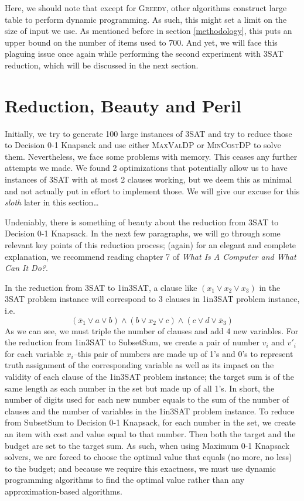 \documentclass[12pt, oneside]{book}
\begin{document}
Here, we should note that except for \textsc{Greedy}, other algorithms
construct large table to perform dynamic programming. As such, this
might set a limit on the size of input we use. As mentioned before in
section \ref{methodology}, this puts an upper bound on the number of
items used to 700. And yet, we will face this plaguing issue once again
while performing the second experiment with 3SAT reduction, which will
be discussed in the next section.

\chapter{Reduction, Beauty and Peril}\label{reduction}

Initially, we try to generate 100 large instances of 3SAT and try to
reduce those to Decision 0-1 Knapsack and use either \textsc{MaxValDP}
or \textsc{MinCostDP} to solve them. Nevertheless, we face some problems
with memory. This ceases any further attempts we made. We found 2
optimizations that potentially allow us to have instances of 3SAT with
at most 2 clauses working, but we deem this as minimal and not actually
put in effort to implement those. We will give our excuse for this
\emph{sloth} later in this section\ldots{}

Undeniably, there is something of beauty about the reduction from 3SAT
to Decision 0-1 Knapsack. In the next few paragraphs, we will go through
some relevant key points of this reduction process; (again) for an
elegant and complete explanation, we recommend reading chapter 7 of
\emph{What Is A Computer and What Can It Do?}.

In the reduction from 3SAT to 1in3SAT, a clause like
\((x_1 \lor x_2 \lor x_3)\) in the 3SAT problem instance will correspond
to 3 clauses in 1in3SAT problem instance, i.e.
\[(\bar{x}_1 \lor a \lor b)\land (b \lor x_2 \lor c)\land (c \lor d \lor \bar{x}_3)\]
As we can see, we must triple the number of clauses and add 4 new
variables. For the reduction from 1in3SAT to SubsetSum, we create a pair
of number \(v_i\) and \(v'_i\) for each variable \(x_i\)--this pair of
numbers are made up of 1's and 0's to represent truth assignment of the
corresponding variable as well as its impact on the validity of each
clause of the 1in3SAT problem instance; the target sum is of the same
length as each number in the set but made up of all 1's. In short, the
number of digits used for each new number equals to the sum of the
number of clauses and the number of variables in the 1in3SAT problem
instance. To reduce from SubsetSum to Decision 0-1 Knapsack, for each
number in the set, we create an item with cost and value equal to that
number. Then both the target and the budget are set to the target sum.
As such, when using Maximum 0-1 Knapsack solvers, we are forced to
choose the optimal value that equals (no more, no less) to the budget;
and because we require this exactness, we must use dynamic programming
algorithms to find the optimal value rather than any approximation-based
algorithms.
\end{document}
